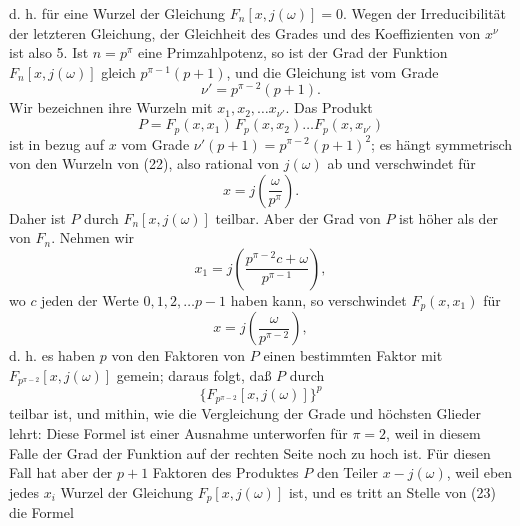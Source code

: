 d. h. für eine Wurzel der Gleichung $F_n[x, j(\omega)] = 0$. Wegen der Irreducibilität der letzteren Gleichung, der Gleichheit des Grades und des Koeffizienten von $x^{\nu}$ ist also
5. Ist $n = p^{\pi}$ eine Primzahlpotenz, so ist der Grad der Funktion $F_n[x, j(\omega)]$ gleich $p^{\pi-1}(p+1)$, und die Gleichung
ist vom Grade
\[
\nu' = p^{\pi-2}(p+1).
\]
Wir bezeichnen ihre Wurzeln mit $x_1, x_2, \dots x_{\nu'}$.
Das Produkt
\[
P = F_p(x, x_1)\, F_p(x, x_2) \dots F_p(x, x_{\nu'})
\]
ist in bezug auf $x$ vom Grade $\nu'(p+1) = p^{\pi-2}(p+1)^2$; es hängt symmetrisch von den Wurzeln von (22), also rational von $j(\omega)$ ab und verschwindet für
\[
x = j\left(\frac{\omega}{p^{\pi}}\right).
\]
Daher ist $P$ durch $F_n[x, j(\omega)]$ teilbar.
Aber der Grad von $P$ ist höher als der von $F_n$. Nehmen wir
\[
x_1 = j\left(\frac{p^{\pi-2}c + \omega}{p^{\pi-1}}\right),
\]
wo $c$ jeden der Werte $0, 1, 2, \dots p-1$ haben kann, so verschwindet $F_p(x, x_1)$ für
\[
x = j\left(\frac{\omega}{p^{\pi-2}}\right),
\]
d. h. es haben $p$ von den Faktoren von $P$ einen bestimmten Faktor mit $F_{p^{\pi-2}}[x, j(\omega)]$ gemein; daraus folgt, daß $P$ durch
\[
\{F_{p^{\pi-2}}[x, j(\omega)]\}^p
\]
teilbar ist, und mithin, wie die Vergleichung der Grade und höchsten Glieder lehrt:
Diese Formel ist einer Ausnahme unterworfen für $\pi = 2$, weil in diesem Falle der Grad der Funktion auf der rechten Seite noch zu hoch ist. Für diesen Fall hat aber  der $p+1$ Faktoren des Produktes $P$ den Teiler $x - j(\omega)$, weil eben jedes $x_i$ Wurzel der Gleichung $F_p[x, j(\omega)]$ ist, und es tritt an Stelle von (23) die Formel
